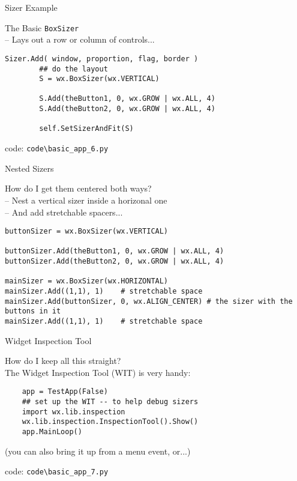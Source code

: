\documentclass{beamer}
\begin{document}
\begin{frame}[fragile]{Sizer Example}

{\Large The Basic \verb`BoxSizer`}\\
{\large  -- Lays out a row or column of controls...}

\vfill
\begin{verbatim}
Sizer.Add( window, proportion, flag, border )
        ## do the layout
        S = wx.BoxSizer(wx.VERTICAL)
        
        S.Add(theButton1, 0, wx.GROW | wx.ALL, 4)
        S.Add(theButton2, 0, wx.GROW | wx.ALL, 4)
        
        self.SetSizerAndFit(S)
\end{verbatim}
\vfill
code: \verb`code\basic_app_6.py`
\end{frame}

\begin{frame}[fragile]{Nested Sizers}

{\Large How do I get them centered both ways?}\\
{\large  -- Nest a vertical sizer inside a horizonal one}\\
{\large  -- And add stretchable spacers...}

\vfill
\begin{verbatim}
buttonSizer = wx.BoxSizer(wx.VERTICAL)
        
buttonSizer.Add(theButton1, 0, wx.GROW | wx.ALL, 4)
buttonSizer.Add(theButton2, 0, wx.GROW | wx.ALL, 4)

mainSizer = wx.BoxSizer(wx.HORIZONTAL)
mainSizer.Add((1,1), 1)    # stretchable space
mainSizer.Add(buttonSizer, 0, wx.ALIGN_CENTER) # the sizer with the buttons in it
mainSizer.Add((1,1), 1)    # stretchable space
\end{verbatim}

\end{frame}

\begin{frame}[fragile]{Widget Inspection Tool}

{\Large How do I keep all this straight?}\\

\vfill
{\large  The Widget Inspection Tool (WIT) is very handy:}

\vfill
\begin{verbatim}
    app = TestApp(False)
    ## set up the WIT -- to help debug sizers
    import wx.lib.inspection
    wx.lib.inspection.InspectionTool().Show()
    app.MainLoop()
\end{verbatim}

(you can also bring it up from a menu event, or...)

\vfill
code: \verb`code\basic_app_7.py`

\end{frame}
\end{document}

